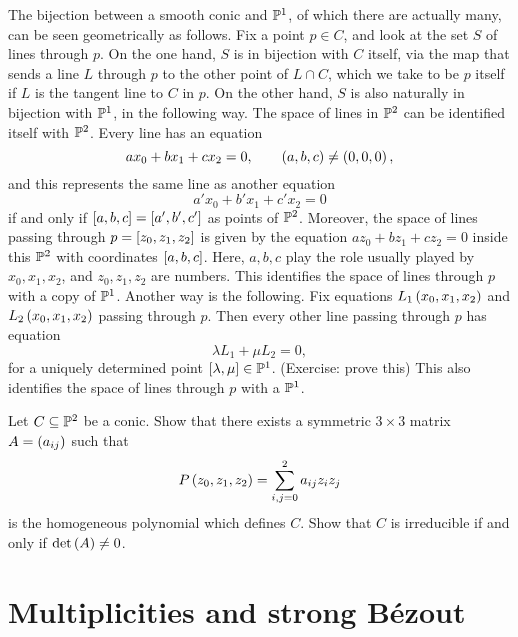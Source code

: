 \begin{remark}
The bijection between a smooth conic and $ \P^1 $, of which there are actually many, can be seen geometrically as follows. Fix a point $ p \in C $, and look at the set $ S $ of lines through $ p $. On the one hand, $ S $ is in bijection with $ C $ itself, via the map that sends a line $ L $ through $ p $ to the other point of $ L \cap C $, which we take to be $ p $ itself if $ L $ is the tangent line to $ C $ in $ p $. On the other hand, $ S $ is also naturally in bijection with $ \P^1 $, in the following way. The space of lines in $ \P^2 $ can be identified itself with $ \P^2 $. Every line has an equation
$$ ax_0 + bx_1 + cx_2 = 0, \qquad \rb{a, b, c} \ne \rb{0, 0, 0}, $$
and this represents the same line as another equation
$$ a'x_0 + b'x_1 + c'x_2 = 0 $$
if and only if $ \sb{a, b, c} = \sb{a', b', c'} $ as points of $ \P^2 $. Moreover, the space of lines passing through $ p = \sb{z_0, z_1, z_2} $ is given by the equation $ az_0 + bz_1 + cz_2 = 0 $ inside this $ \P^2 $ with coordinates $ \sb{a, b, c} $. Here, $ a, b, c $ play the role usually played by $ x_0, x_1, x_2 $, and $ z_0, z_1, z_2 $ are numbers. This identifies the space of lines through $ p $ with a copy of $ \P^1 $. Another way is the following. Fix equations $ L_1\rb{x_0, x_1, x_2} $ and $ L_2\rb{x_0, x_1, x_2} $ passing through $ p $. Then every other line passing through $ p $ has equation
$$ \lambda L_1 + \mu L_2 = 0, $$
for a uniquely determined point $ \sb{\lambda, \mu} \in \P^1 $. (Exercise: prove this) This also identifies the space of lines through $ p $ with a $ \P^1 $.
\end{remark}

\begin{exercise}
\label{ex:31}
Let $ C \subseteq \P^2 $ be a conic. Show that there exists a symmetric $ 3 \times 3 $ matrix $ A = \rb{a_{ij}} $ such that
$$ P\rb{z_0, z_1, z_2} = \sum_{i, j = 0}^2 a_{ij}z_iz_j $$
is the homogeneous polynomial which defines $ C $. Show that $ C $ is irreducible if and only if $ \det\rb{A} \ne 0 $.
\end{exercise}

\pagebreak

\section{Multiplicities and strong B\'ezout}

